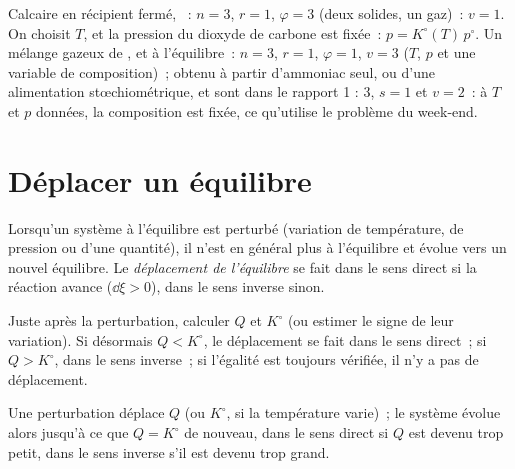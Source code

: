\begin{example}\label{ex:b2:equilibrium-shifts:variances}
Calcaire en récipient fermé, ~: $n = 3$, $r =
1$, $\varphi = 3$ (deux solides, un gaz)~: $v = 1$. On choisit $T$, et la pression
du dioxyde de carbone est fixée~: $p = K^\circ(T)\,p^\circ$. Un mélange gazeux de
,  et  à l'équilibre~: $n = 3$, $r = 1$, $\varphi = 1$, $v
= 3$ ($T$, $p$ et une variable de composition)~; obtenu à partir d'ammoniac seul, ou d'une
alimentation stœchiométrique,  et  sont dans le rapport 1 : 3, $s = 1$ et
$v = 2$~: à $T$ et $p$ données, la composition est fixée, ce qu'utilise le problème
du week-end.
\end{example}

\section{Déplacer un équilibre}

\begin{definition}\label{def:b2:equilibrium-shifts:shift}
Lorsqu'un système à l'équilibre est perturbé (variation de température, de
pression ou d'une quantité), il n'est en général plus à l'équilibre et
évolue vers un nouvel équilibre. Le \emph{déplacement de l'équilibre}
se fait dans le sens direct si la réaction avance ($\dd\xi > 0$), dans le sens inverse
sinon.
\end{definition}

\begin{method}\label{met:b2:equilibrium-shifts:predict-shift}
Juste après la perturbation, calculer $Q$ et $K^\circ$ (ou estimer le signe de leur variation).
Si désormais $Q < K^\circ$, le déplacement se fait dans le sens direct~; si $Q > K^\circ$,
dans le sens inverse~; si l'égalité est toujours vérifiée, il n'y a pas de déplacement.
\end{method}

\begin{omfigure}

{\small Une perturbation déplace $Q$ (ou $K^\circ$, si la température varie)~;
le système évolue alors jusqu'à ce que $Q = K^\circ$ de nouveau, dans le sens direct si $Q$ est devenu
trop petit, dans le sens inverse s'il est devenu trop grand.}
\end{omfigure}

